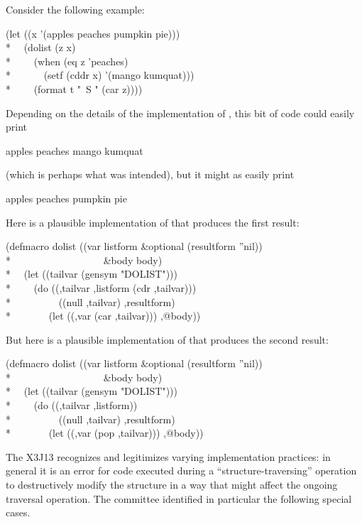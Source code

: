 Consider the following example:
\begin{lisp}
(let ((x '(apples peaches pumpkin pie))) \\*
~~(dolist (z x) \\*
~~~~(when (eq z 'peaches) \\*
~~~~~~(setf (cddr x) '(mango kumquat))) \\*
~~~~(format t "~S " (car z))))
\end{lisp}
Depending on the details of the implementation of ,
this bit of code could easily print
\begin{lisp}
apples peaches mango kumquat
\end{lisp}
(which is perhaps what was intended), but it might as easily print
\begin{lisp}
apples peaches pumpkin pie
\end{lisp}
Here is a plausible implementation of  that
produces the first result:
\begin{lisp}
(defmacro dolist ((var listform \&optional (resultform ''nil)) \\*
~~~~~~~~~~~~~~~~~~\&body body) \\*
~~(let ((tailvar (gensym "DOLIST"))) \\*
~~~~{\Xbq}(do ((,tailvar ,listform (cdr ,tailvar))) \\*
~~~~~~~~~((null ,tailvar) ,resultform) \\*
~~~~~~~(let ((,var (car ,tailvar))) ,@body))
\end{lisp}
But here is a plausible implementation of  that
produces the second result:
\begin{lisp}
(defmacro dolist ((var listform \&optional (resultform ''nil)) \\*
~~~~~~~~~~~~~~~~~~\&body body) \\*
~~(let ((tailvar (gensym "DOLIST"))) \\*
~~~~{\Xbq}(do ((,tailvar ,listform)) \\*
~~~~~~~~~((null ,tailvar) ,resultform) \\*
~~~~~~~(let ((,var (pop ,tailvar))) ,@body))
\end{lisp}

The X3J13 recognizes and legitimizes varying implementation practices:
in general it is an error for code executed during a ``structure-traversing''
operation to destructively modify the structure in a way that might
affect the ongoing traversal operation.  The committee identified in particular
the following special cases.

